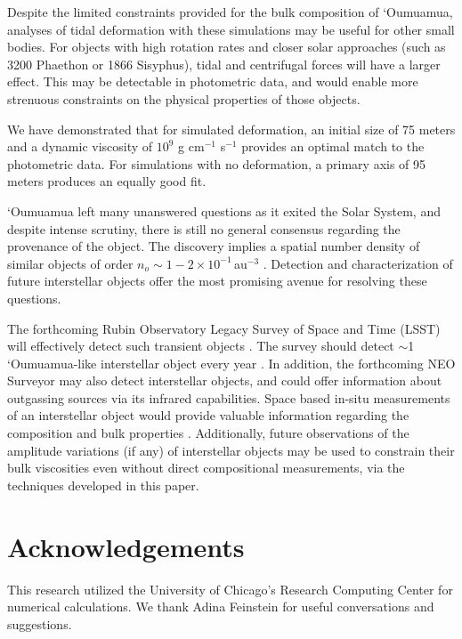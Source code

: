 \documentclass[twocolumn,doublespacing]{aastex631}
\begin{document}
Despite the limited constraints provided for the bulk composition of `Oumuamua, analyses of tidal deformation with these simulations may be useful for other small bodies. For objects with high rotation rates and closer solar approaches (such as 3200 Phaethon or 1866 Sisyphus), tidal and centrifugal forces will have a larger effect. This may be detectable in photometric data, and would enable more strenuous constraints on the physical properties of those objects. 

We have demonstrated that for simulated deformation, an initial size of 75 meters and a dynamic viscosity of $10^9$ g cm$^{-1}$ s$^{-1}$ provides an optimal match to the photometric data. For simulations with no deformation, a primary axis of 95 meters produces an equally good fit. 

`Oumuamua left many unanswered questions as it exited the Solar System, and despite intense scrutiny, there is still no general consensus regarding the provenance of the object. The discovery implies a spatial number density of similar objects of order $n_{o}\sim1-2\times 10^{-1}\,$au$^{-3}$ \citep{Trilling2017,Laughlin2017,jewitt2017,moro2018,Zwart2018,Do2018,moro2019a}. Detection and characterization of future interstellar objects offer the most promising avenue for resolving these questions. 

The forthcoming Rubin Observatory Legacy Survey of Space and Time (LSST) \citep{jones2009lsst,Ivezic2019} will effectively detect such transient objects \citep{solontoi2011comet,Veres2017,veres2017b,Jones2018}. The survey should detect $\sim$1 `Oumuamua-like interstellar object every year \citep{Moro2009,Engelhardt2014,Cook2016,Trilling2017,Seligman2018,Hoover2022}. In addition, the forthcoming NEO Surveyor \citep{Mainzer2015} may also detect interstellar objects, and could offer information about outgassing sources via its infrared capabilities. Space based in-situ measurements of an interstellar object would provide valuable information regarding the composition and bulk properties \citep{Hein2017,Seligman2018,Meech2019whitepaper,Castillo-Rogez2019,jones2019,Hibberd2020,Donitz2021,Sanchez2021,Meech2021,Hibberd2022,Moore2021whitepaper,Moore2021}. Additionally, future observations of the amplitude variations (if any) of interstellar objects may be used to constrain their bulk viscosities even without direct compositional measurements, via the techniques developed in this paper.

 \section{Acknowledgements}
This research utilized the University of Chicago’s Research Computing Center for numerical calculations. We thank Adina Feinstein for useful conversations and suggestions.
\end{document}
